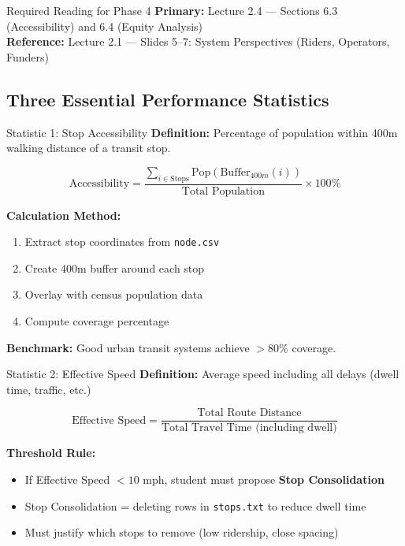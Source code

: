\documentclass[11pt,letterpaper]{article}
\begin{document}
\begin{readingbox}{Required Reading for Phase 4}
\textbf{Primary:} Lecture 2.4 --- Sections 6.3 (Accessibility) and 6.4 (Equity Analysis)\\
\textbf{Reference:} Lecture 2.1 --- Slides 5--7: System Perspectives (Riders, Operators, Funders)
\end{readingbox}

\subsection{Three Essential Performance Statistics}

\begin{metricbox}{Statistic 1: Stop Accessibility}
\textbf{Definition:} Percentage of population within 400m walking distance of a transit stop.

\[
\text{Accessibility} = \frac{\sum_{i \in \text{Stops}} \text{Pop}(\text{Buffer}_{400m}(i))}{\text{Total Population}} \times 100\%
\]

\textbf{Calculation Method:}
\begin{enumerate}[nosep]
    \item Extract stop coordinates from \texttt{node.csv}
    \item Create 400m buffer around each stop
    \item Overlay with census population data
    \item Compute coverage percentage
\end{enumerate}

\textbf{Benchmark:} Good urban transit systems achieve $>80\%$ coverage.
\end{metricbox}

\begin{metricbox}{Statistic 2: Effective Speed}
\textbf{Definition:} Average speed including all delays (dwell time, traffic, etc.)

\[
\text{Effective Speed} = \frac{\text{Total Route Distance}}{\text{Total Travel Time (including dwell)}}
\]

\textbf{Threshold Rule:}
\begin{itemize}[nosep]
    \item If Effective Speed $< 10$ mph, student must propose \textbf{Stop Consolidation}
    \item Stop Consolidation = deleting rows in \texttt{stops.txt} to reduce dwell time
    \item Must justify which stops to remove (low ridership, close spacing)
\end{itemize}
\end{metricbox}
\end{document}
